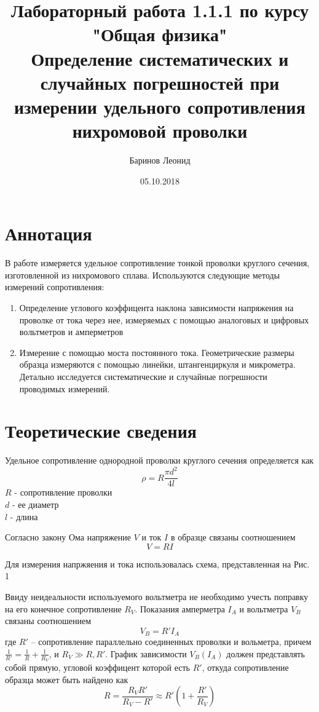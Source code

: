 \documentclass[a4paper,12pt]{article} %
\title{Лабораторный работа 1.1.1 по курсу \\ "Общая физика"  \\ 
\vspace{0.2cm}
\vspace{4.5cm}
 \LARGE{\textbf{Определение систематических и случайных погрешностей при измерении удельного сопротивления нихромовой проволки}}\vspace{5.5cm}}
\date{05.10.2018}
\author{\vspace{0.2cm}Баринов Леонид}
\begin{document}
\maketitle
\newpage
\section{Аннотация}
В работе измеряется удельное сопротивление тонкой проволки круглого сечения, изготовленной из нихромового сплава. Используются следующие методы измерений сопротивления:
\begin{enumerate}
\item Определение углового коэффицента наклона зависимости напряжения на проволке от тока через нее, измеряемых с помощью аналоговых и цифровых вольтметров и амперметров
\item Измерение с помощью моста постоянного тока. Геометрические размеры образца измеряются с помощью линейки, штангенциркуля и микрометра. Детально исследуется систематические и случайные погрешности проводимых измерений.
\end{enumerate}

\section{Теоретические сведения}
Удельное сопротивление однородной проволки круглого сечения определяется как
\begin{equation}
\label{1}
\rho = R\frac{\pi d^2}{4l}
\end{equation}
$R$ - сопротивление проволки\\
$d$ - ее диаметр\\
$l$ - длина

Согласно закону Ома напряжение $V$  и ток $I$ в образце связаны соотношением
\begin{equation}
\label{2}
V = RI
\end{equation}



Для измерения  напржяения и тока использовалась схема, представленная на Рис. 1

Ввиду неидеальности используемого вольтметра не необходимо учесть поправку на его конечное сопротивление $R_V$. Показания амперметра $I_A$ и вольтметра $V_B$  связаны соотношением
\begin{equation}
\label{3}
V_B = R'I_A
\end{equation}
где $R'$ -- сопротивление параллельно соединенных проволки и вольметра, причем $\frac{1}{R'} = \frac{1}{R}+\frac{1}{R_V}$, и $R_V \gg R, R'$. График зависимости $V_B(I_A)$ должен представлять собой прямую, угловой коэффицент которой есть $R'$, откуда сопротивление образца может быть найдено как
\begin{equation}
\label{4}
R = \frac{R_VR'}{R_V - R'} \approx R'(1+\frac{R'}{R_V})
\end{equation}
\end{document}
